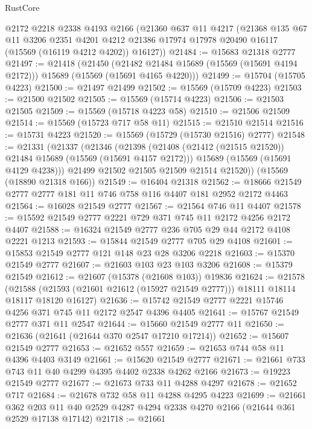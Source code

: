\begin{lexlean}{RustCore}
\begin{coremodule}
    @2172
    @2218
    @2338
    @4193
    @2166
    (@21360
      @637
      @11
      @4217
      (@21368
        @135
        @67
        @11
        @3206
        @2351
        @4201
        @4212
        @21386
        @17974
        @17978
        @20490
        @16117
        (@15569 (@16119 @4212 @4202))
        @16127))
@21484 := @15683 @21318 @2777
@21497 := @21418
    (@21450
      (@21482 @21484 @15689 (@15569 (@15691 @4194 @2172)))
      @15689
      (@15569 (@15691 @4165 @4220)))
@21499 := @15704 (@15705 @4223)
@21500 := @21497 @21499
@21502 := @15569 (@15709 @4223)
@21503 := @21500 @21502
@21505 := @15569 (@15714 @4223)
@21506 := @21503 @21505
@21509 := @15569 (@15718 @4223 @58)
@21510 := @21506 @21509
@21514 := @15569 (@15723 @717 @58 @11)
@21515 := @21510 @21514
@21516 := @15731 @4223
@21520 := @15569 (@15729 (@15730 @21516) @2777)
@21548 := @21331
    (@21337
      (@21346
        (@21398
          (@21408 (@21412 (@21515 @21520)) @21484 @15689 (@15569 (@15691 @4157 @2172)))
          @15689
          (@15569 (@15691 @4129 @4238)))
        @21499
        @21502
        @21505
        @21509
        @21514
        @21520))
    (@15569 (@18890 @21318 @166))
@21549 := @16404 @21318
@21562 := @18666 @21549 @2777 @2777 @181 @11 @746 @758 @116 @4407 @181 @2952 @2172 @4463
@21564 := @16028 @21549 @2777
@21567 := @21564 @746 @11 @4407
@21578 := @15592 @21549 @2777 @2221 @729 @371 @745 @11 @2172 @4256 @2172 @4407
@21588 := @16324 @21549 @2777 @236 @705 @29 @44 @2172 @4108 @2221 @1213
@21593 := @15844 @21549 @2777 @705 @29 @4108
@21601 := @15853 @21549 @2777 @121 @148 @23 @28 @3206 @2218
@21603 := @15370 @21549 @2777
@21607 := @21603 @103 @23 @103 @3206
@21608 := @15379 @21549
@21612 := @21607 (@15378 (@21608 @103)) @19836
@21624 := @21578
    (@21588 (@21593 (@21601 @21612 (@15927 @21549 @2777))) @18111 @18114 @18117 @18120 @16127)
@21636 := @15742 @21549 @2777 @2221 @15746 @4256 @371 @745 @11 @2172 @2547 @4396 @4405
@21641 := @15767 @21549 @2777 @371 @11 @2547
@21644 := @15660 @21549 @2777 @11
@21650 := @21636 (@21641 (@21644 @370 @2547 @17210 @17214))
@21652 := @15607 @21549 @2777
@21653 := @21652 @557
@21659 := @21653 @744 @58 @11 @4396 @4403 @3149
@21661 := @15620 @21549 @2777
@21671 := @21661 @733 @743 @11 @40 @4299 @4395 @4402 @2338 @4262 @2166
@21673 := @19223 @21549 @2777
@21677 := @21673 @733 @11 @4288 @4297
@21678 := @21652 @717
@21684 := @21678 @732 @58 @11 @4288 @4295 @4223
@21699 := @21661
    @362
    @203
    @11
    @40
    @2529
    @4287
    @4294
    @2338
    @4270
    @2166
    (@21644 @361 @2529 @17138 @17142)
@21718 := @21661

\end{coremodule}
\end{lexlean}
